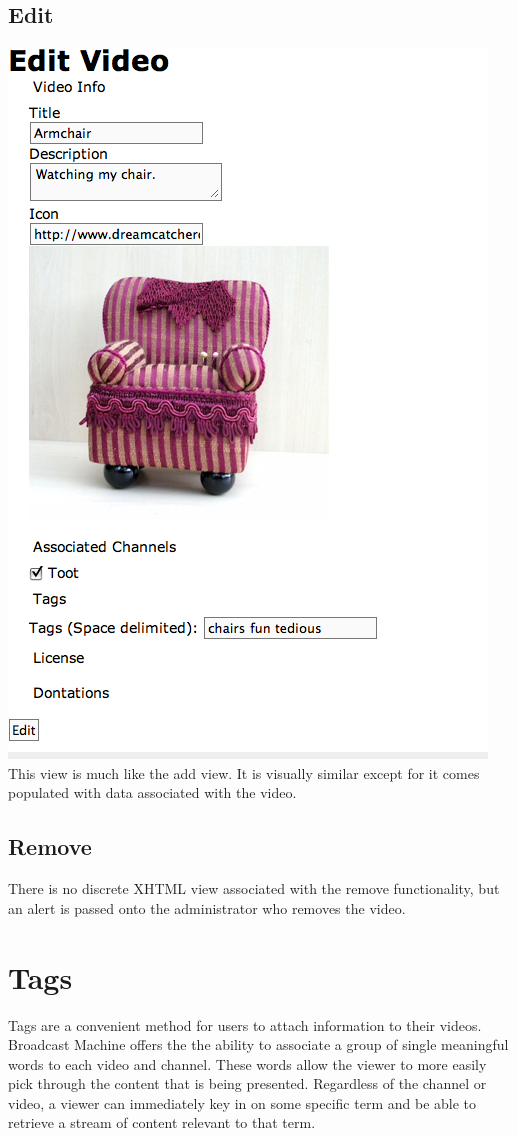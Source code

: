 \documentclass[a4paper,12pt]{report}
\begin{document}
\subsection{Edit}
\includegraphics{images/videoedit.png}
This view is much like the add view. It is visually similar except for it comes populated with data associated with the video.

\subsection{Remove}
There is no discrete XHTML view associated with the remove functionality, but an alert is passed onto the administrator who removes the video.

\section{Tags}
Tags are a convenient method for users to attach information to their videos.
Broadcast Machine offers the the ability to associate a group of single meaningful words to each video and channel.
These words allow the viewer to more easily pick through the content that is being presented.
Regardless of the channel or video, a viewer can immediately key in on some specific term and be able to retrieve a stream of content relevant to that term.
\end{document}
